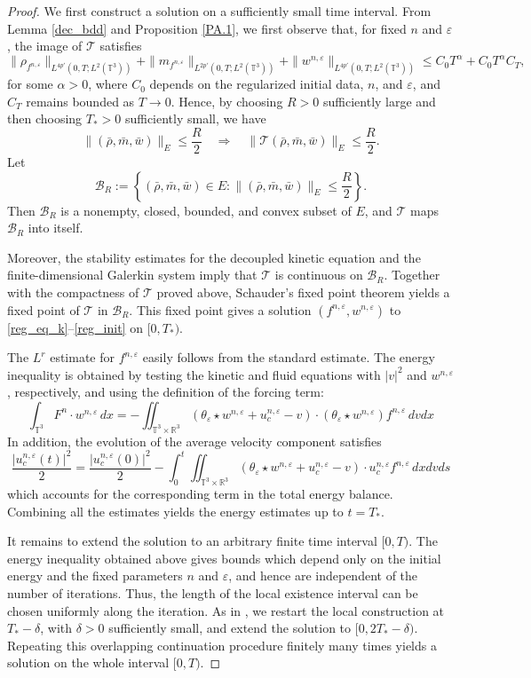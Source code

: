 \documentclass[10pt,reqno]{amsart}
\numberwithin{equation}{section}
\newcommand{\R}{\mathbb R}
\newcommand{\T}{\mathbb T}
\newcommand{\e}{\varepsilon}
\newcommand{\lt}{\left}
\newcommand{\rt}{\right}
\newcommand{\intt}{\int_{\T^3}}
\newcommand{\inttr}{\iint_{\T^3 \times \R^3}}
\begin{document}
\begin{proof}
We first construct a solution on a sufficiently small time interval. From Lemma \ref{dec_bdd} and Proposition \ref{PA.1}, we first observe that,
for fixed $n$ and $\e$, the image of $\mathcal T$ satisfies
\[
\|\rho_{f^{n,\e}}\|_{L^{4p'}(0,T;L^2(\T^3))} + \|m_{f^{n,\e}}\|_{L^{2p'}(0,T;L^2(\T^3))} + \|w^{n,\e}\|_{L^{4p'}(0,T;L^2(\T^3))} \le C_0 T^\alpha + C_0 T^\alpha C_T,
\]
for some $\alpha>0$, where $C_0$ depends on the regularized initial data,
$n$, and $\e$, and $C_T$ remains bounded as $T\to0$. Hence, by choosing
$R>0$ sufficiently large and then choosing $T_*>0$ sufficiently small, we have
\[
\|(\bar \rho,\bar m,\bar w)\|_E\le \frac R2 \quad\Longrightarrow\quad \|\mathcal T(\bar \rho,\bar m,\bar w)\|_E\le \frac R2.
\]
Let
\[
\mathcal B_R:=\lt\{(\bar \rho,\bar m,\bar w)\in E: \|(\bar \rho,\bar m,\bar w)\|_E\le \frac R2\rt\}.
\]
Then $\mathcal B_R$ is a nonempty, closed, bounded, and convex subset of $E$, and $\mathcal T$ maps $\mathcal B_R$ into itself.

Moreover, the stability estimates for the decoupled kinetic equation and the finite-dimensional Galerkin system imply that $\mathcal T$ is continuous on $\mathcal B_R$. Together with the compactness of $\mathcal T$ proved above, Schauder's fixed point theorem yields a fixed point of $\mathcal T$ in $\mathcal B_R$. This fixed point gives a solution $(f^{n,\e},w^{n,\e})$ to \eqref{reg_eq_k}--\eqref{reg_init} on $[0,T_*)$.

The $L^r$ estimate for $f^{n,\e}$ easily follows from the standard estimate. The energy inequality is obtained by testing the kinetic and fluid equations with $|v|^2$ and $w^{n,\e}$, respectively, and using the definition of the forcing term:
\[
\intt  F^n \cdot w^{n,\e} \,dx = -\inttr (\theta_\e \star w^{n,\e} +u_c^{n,\e}-v)\cdot (\theta_\e \star  w^{n,\e})f^{n,\e}\,dvdx
\]
In addition, the evolution of the average velocity component satisfies
\[
\frac{|u_c^{n,\e}(t)|^2}{2} = \frac{|u_c^{n,\e}(0)|^2}{2} - \int_0^t \inttr (\theta_\e \star w^{n,\e} + u_c^{n,\e} - v)\cdot u_c^{n,\e} f^{n,\e} \,dxdvds
\]
which accounts for the corresponding term in the total energy balance. Combining all the estimates yields the energy estimates up to $t=T_*$. 

It remains to extend the solution to an arbitrary finite time interval $[0,T)$. The energy inequality obtained above gives bounds which depend only on the initial energy and the fixed parameters $n$ and $\e$, and hence are independent of the number of iterations. Thus, the length of the local existence interval can be chosen uniformly along the iteration. As in \cite{BDGM09}, we restart the local construction at $T_*-\delta$, with $\delta>0$ sufficiently small, and extend the solution to $[0,2T_*-\delta)$. Repeating this overlapping continuation procedure finitely many times yields a solution on the whole interval $[0,T)$. 
\end{proof}
\end{document}
